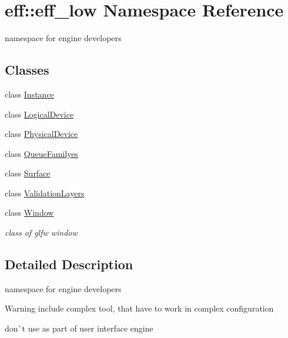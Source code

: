 \hypertarget{namespaceeff_1_1eff__low}{}\section{eff\+:\+:eff\+\_\+low Namespace Reference}
\label{namespaceeff_1_1eff__low}


namespace for engine developers  


\subsection*{Classes}
\begin{DoxyCompactItemize}
\item 
class \mbox{\hyperlink{classeff_1_1eff__low_1_1Instance}{Instance}}
\item 
class \mbox{\hyperlink{classeff_1_1eff__low_1_1LogicalDevice}{Logical\+Device}}
\item 
class \mbox{\hyperlink{classeff_1_1eff__low_1_1PhysicalDevice}{Physical\+Device}}
\item 
class \mbox{\hyperlink{classeff_1_1eff__low_1_1QueueFamilyes}{Queue\+Familyes}}
\item 
class \mbox{\hyperlink{classeff_1_1eff__low_1_1Surface}{Surface}}
\item 
class \mbox{\hyperlink{classeff_1_1eff__low_1_1ValidationLayers}{Validation\+Layers}}
\item 
class \mbox{\hyperlink{classeff_1_1eff__low_1_1Window}{Window}}
\begin{DoxyCompactList}\small\item\em class of glfw window \end{DoxyCompactList}\end{DoxyCompactItemize}


\subsection{Detailed Description}
namespace for engine developers 

\begin{DoxyWarning}{Warning}
include complex tool, that have to work in complex configuration 

don\`{}t use as part of user interface engine 
\end{DoxyWarning}
